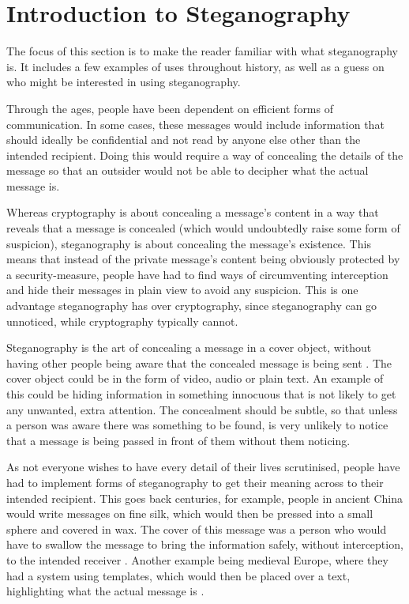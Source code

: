 \section{Introduction to Steganography}
The focus of this section is to make the reader familiar with what steganography is. It includes a few examples of uses throughout history, as well as a guess on who might be interested in using steganography.\vspace*{12pt}

\noindent Through the ages, people have been dependent on efficient forms of communication. 
In some cases, these messages would include information that should ideally be confidential and not read by anyone else other than the intended recipient.
Doing this would require a way of concealing the details of the message so that an outsider would not be able to decipher what the actual message is.

Whereas cryptography is about concealing a message's content in a way that reveals that a message is concealed (which would undoubtedly raise some form of suspicion), steganography is about concealing the message's existence.
This means that instead of the private message's content being obviously protected by a security-measure, people have had to find ways of circumventing interception and hide their messages in plain view to avoid any suspicion.
This is one advantage steganography has over cryptography, since steganography can go unnoticed, while cryptography typically cannot. 

Steganography is the art of concealing a message in a cover object, without having other people being aware that the concealed message is being sent \citep{Anderson1998}.
The cover object could be in the form of video, audio or plain text.
An example of this could be hiding information in something innocuous that is not likely to get any unwanted, extra attention.
The concealment should be subtle, so that unless a person was aware there was something to be found, is very unlikely to notice that a message is being passed in front of them without them noticing.

As not everyone wishes to have every detail of their lives scrutinised, people have had to implement forms of steganography to get their meaning across to their intended recipient.
This goes back centuries, for example, people in ancient China would write messages on fine silk, which would then be pressed into a small sphere and covered in wax.
The cover of this message was a person who would have to swallow the message to bring the information safely, without interception, to the intended receiver \citep{Singh2001}.
Another example being medieval Europe, where they had a system using templates, which would then be placed over a text, highlighting what the actual message is \citep{Anderson1998}.

